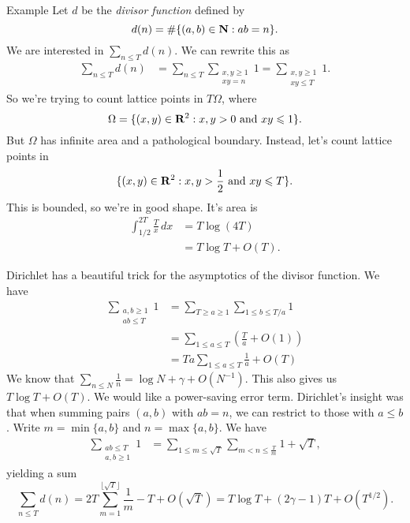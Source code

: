 \begin{enonce}[remark]{Example}
Let $d$ be the \emph{divisor function} defined by 
\[
  d(n) = \#\{(a,b)\in \mathbf{N}:a b=n\} .
\]
We are interested in $\sum_{n\leqslant T} d(n)$. We can rewrite this as 
\begin{align*}
  \sum_{n\leqslant T} d(n) &= \sum_{n\leqslant T} \sum_{\substack{x,y\geqslant 1 \\ x y = n}} 1 = \sum_{\substack{x,y\geqslant 1 \\ x y\leqslant T}} 1 .
\end{align*}
So we're trying to count lattice points in $T\Omega$, where 
\[
  \Omega=\{(x,y)\in \mathbf{R}^2:x,y>0\text{ and }x y\leqslant 1\} .
\]
But $\Omega$ has infinite area and a pathological boundary. Instead, let's 
count lattice points in 
\[
  \{(x,y)\in \mathbf{R}^2:x,y>\frac 1 2\text{ and }x y\leqslant T\} .
\]
This is bounded, so we're in good shape. It's area is 
\begin{align*}
  \int_{1/2}^{2 T} \frac{T}{x}\, d x 
    &= T \log(4 T) \\
    &= T\log T+O(T) .
\end{align*}
\end{enonce}

Dirichlet has a beautiful trick for the asymptotics of the divisor function. We 
have 
\begin{align*}
  \sum_{\substack{a,b\geqslant 1 \\ a b\leqslant T}} 1 
    &= \sum_{T\geqslant a\geqslant 1} \sum_{1\leqslant b\leqslant T/a} 1 \\
    &= \sum_{1\leqslant a\leqslant T}\left(\frac T a+O(1)\right) \\
    &= T a\sum_{1\leqslant a\leqslant T} \frac 1 a + O(T) 
\end{align*}
We know that $\sum_{n\leqslant N} \frac 1 n = \log N+\gamma+O(N^{-1})$. This 
also gives us $T\log T+O(T)$. We would like a power-saving error term. 
Dirichlet's insight was that when summing pairs $(a,b)$ with $a b=n$, we can 
restrict to those with $a\leqslant b$. Write $m=\min\{a,b\}$ and 
$n=\max\{a,b\}$. We have 
\begin{align*}
  \sum_{\substack{a b\leqslant T \\ a,b\geqslant 1}} 1
    &= \sum_{1\leqslant m \leqslant \sqrt T} \sum_{m<n \leqslant \frac{T}{m}} 1+\sqrt T ,
\end{align*}
yielding a sum 
\[
  \sum_{n\leqslant T} d(n) = 2 T \sum_{m=1}^{\lfloor \sqrt T\rfloor} \frac 1 m - T+O(\sqrt T) = T\log T+(2\gamma-1)T + O(T^{1/2}) .
\]





